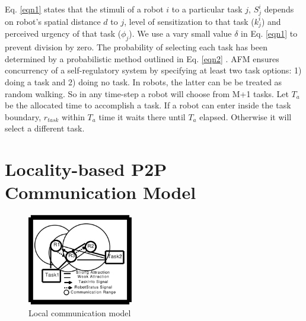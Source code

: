 \documentclass[letterpaper, 10 pt, times, conference]{ieeeconf} %
\begin{document}
Eq. \ref{eqn1} states that the stimuli of a robot $i$ to a particular task $j$, $S_{j}^{i}$ depends on robot's spatial distance $d$ to $j$, level of sensitization to that task ($k_{j}^{i}$) and perceived urgency of that task ($\phi _{j}$). We use a vary small value $\delta$ in Eq. \ref{eqn1} to prevent division by zero. The probability of selecting each task has been determined by a probabilistic method outlined in Eq. \ref{eqn2} \cite{Elsa}. 
AFM ensures concurrency of a self-regulatory system by specifying at least two task options: 1) doing a task and 2) doing no task. In robots, the latter can be be treated as random walking. So in any time-step a robot will choose from M+1 tasks. Let $T_a$ be the allocated time to accomplish a task. If a robot can enter inside the task boundary, $r_{task}$ within $T_a$ time it waits there until $T_a$ elapsed. Otherwise it will select a different task. 
\section{Locality-based P2P Communication Model}
\label{sec:comm-model}
\begin{figure}
\centering
\includegraphics[height=4cm]{../dia-files/LocalComm}
\caption{Local communication model}
\label{fig:lcm} %
\end{figure}
\end{document}
